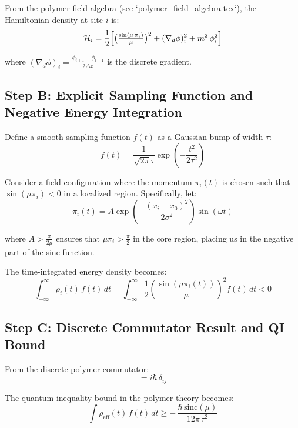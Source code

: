 \documentclass[12pt]{article}
\begin{document}
From the polymer field algebra (see `polymer_field_algebra.tex`), the Hamiltonian density at site $i$ is:
\begin{equation}
\mathcal H_i = \frac12\Bigl[\bigl(\tfrac{\sin(\mu\,\pi_i)}{\mu}\bigr)^2 + (\nabla_d \phi)_i^2 + m^2\,\phi_i^2\Bigr]
\end{equation}

where $(\nabla_d \phi)_i = \frac{\phi_{i+1} - \phi_{i-1}}{2\Delta x}$ is the discrete gradient.

\subsection{Step B: Explicit Sampling Function and Negative Energy Integration}

Define a smooth sampling function $f(t)$ as a Gaussian bump of width $\tau$:
\begin{equation}
f(t) = \frac{1}{\sqrt{2\pi}\tau} \exp\left(-\frac{t^2}{2\tau^2}\right)
\end{equation}

Consider a field configuration where the momentum $\pi_i(t)$ is chosen such that $\sin(\mu \pi_i) < 0$ in a localized region. Specifically, let:
\begin{equation}
\pi_i(t) = A \exp\left(-\frac{(x_i - x_0)^2}{2\sigma^2}\right) \sin(\omega t)
\end{equation}

where $A > \frac{\pi}{2\mu}$ ensures that $\mu \pi_i > \frac{\pi}{2}$ in the core region, placing us in the negative part of the sine function.

The time-integrated energy density becomes:
\begin{equation}
\int_{-\infty}^{\infty} \rho_i(t)\,f(t)\,dt = \int_{-\infty}^{\infty} \frac{1}{2}\left(\frac{\sin(\mu \pi_i(t))}{\mu}\right)^2 f(t)\,dt < 0
\end{equation}

\subsection{Step C: Discrete Commutator Result and QI Bound}

From the discrete polymer commutator:
\begin{equation}
[\hat{\phi}_i, \hat{\pi}_j^{\text{poly}}] = i\hbar\,\delta_{ij}
\end{equation}

The quantum inequality bound in the polymer theory becomes:
\begin{equation}
\int \rho_{\text{eff}}(t)\,f(t)\,dt \geq -\,\frac{\hbar\,\text{sinc}(\mu)}{12\pi\,\tau^2}
\end{equation}
\end{document}
